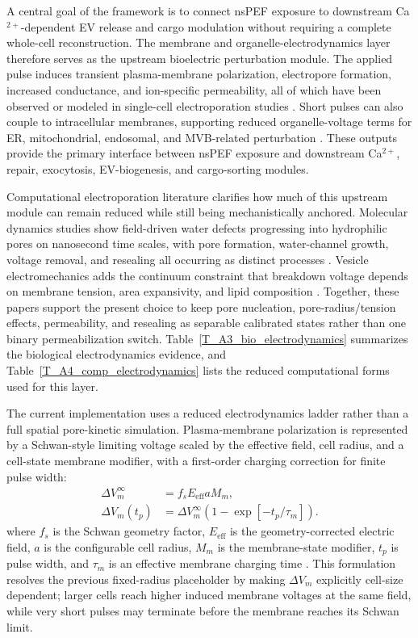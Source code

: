 A central goal of the framework is to connect nsPEF exposure to downstream Ca$^{2+}$-dependent EV release and cargo modulation without requiring a complete whole-cell reconstruction. The membrane and organelle-electrodynamics layer therefore serves as the upstream bioelectric perturbation module. The applied pulse induces transient plasma-membrane polarization, electropore formation, increased conductance, and ion-specific permeability, all of which have been observed or modeled in single-cell electroporation studies \cite{kotnik2000analytical,krassowska2007modeling,pakhomov2007long}. Short pulses can also couple to intracellular membranes, supporting reduced organelle-voltage terms for ER, mitochondrial, endosomal, and MVB-related perturbation \cite{vernier2003calcium,semenov2013primary,beebe2012transient,baker2024numerical}. These outputs provide the primary interface between nsPEF exposure and downstream Ca$^{2+}$, repair, exocytosis, EV-biogenesis, and cargo-sorting modules.

Computational electroporation literature clarifies how much of this upstream module can remain reduced while still being mechanistically anchored. Molecular dynamics studies show field-driven water defects progressing into hydrophilic pores on nanosecond time scales, with pore formation, water-channel growth, voltage removal, and resealing all occurring as distinct processes \cite{tieleman2004molecular,tarek2005membrane}. Vesicle electromechanics adds the continuum constraint that breakdown voltage depends on membrane tension, area expansivity, and lipid composition \cite{needham1989electro}. Together, these papers support the present choice to keep pore nucleation, pore-radius/tension effects, permeability, and resealing as separable calibrated states rather than one binary permeabilization switch. Table~\ref{T_A3_bio_electrodynamics} summarizes the biological electrodynamics evidence, and Table~\ref{T_A4_comp_electrodynamics} lists the reduced computational forms used for this layer.

The current implementation uses a reduced electrodynamics ladder rather than a full spatial pore-kinetic simulation. Plasma-membrane polarization is represented by a Schwan-style limiting voltage scaled by the effective field, cell radius, and a cell-state membrane modifier, with a first-order charging correction for finite pulse width:
\[
\begin{aligned}
\Delta V_m^{\infty} &= f_sE_{\mathrm{eff}}aM_m, \\
\Delta V_m(t_p) &= \Delta V_m^{\infty}
\left(1-\exp[-t_p/\tau_m]\right).
\end{aligned}
\]
where $f_s$ is the Schwan geometry factor, $E_{\mathrm{eff}}$ is the geometry-corrected electric field, $a$ is the configurable cell radius, $M_m$ is the membrane-state modifier, $t_p$ is pulse width, and $\tau_m$ is an effective membrane charging time \cite{kotnik2000analytical,joshi2000electroporation,kotnik2019membrane}. This formulation resolves the previous fixed-radius placeholder by making $\Delta V_m$ explicitly cell-size dependent; larger cells reach higher induced membrane voltages at the same field, while very short pulses may terminate before the membrane reaches its Schwan limit.

